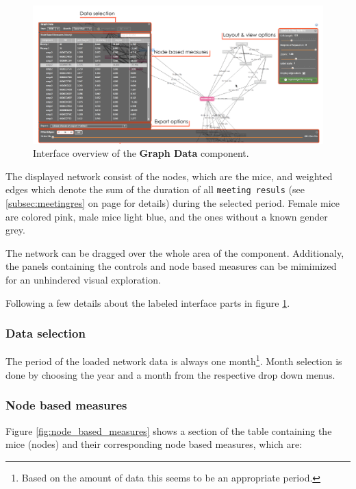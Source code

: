 \begin{figure}[!htpb]
\begin{center}
  \includegraphics[width=\textwidth]{assets/pdf/graph_data_interface_overview.pdf}
  \caption[Graph Data interface overview]{Interface overview of the \textbf{Graph Data} component.}
  \label{fig:graph_data_interface_overview}
\end{center}
\end{figure}

The displayed network consist of the nodes, which are the mice, and weighted edges which denote the sum of the duration of all \lstinline|meeting resuls| (see \ref{subsec:meetingres} on page \pageref{subsec:meetingres} for details) during the selected period. Female mice are colored pink, male mice light blue, and the ones without a known gender grey. 

The network can be dragged over the whole area of the component. Additionaly, the panels containing the controls and node based measures can be mimimized for an unhindered visual exploration.

Following a few details about the labeled interface parts in figure \ref{fig:graph_data_interface_overview}.

\subsubsection*{Data selection}
The period of the loaded network data is always one month\footnote{Based on the amount of data this seems to be an appropriate period.}. Month selection is done by choosing the year and a month from the respective drop down menus.  

\subsubsection*{Node based measures}

Figure \ref{fig:node_based_measures} shows a section of the table containing the mice (nodes) and their corresponding node based measures, which are:

